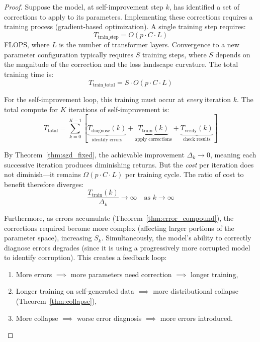 \documentclass[11pt,a4paper]{article}
\begin{document}
\begin{proof}
Suppose the model, at self-improvement step $k$, has identified a set of corrections to apply to its parameters. Implementing these corrections requires a training process (gradient-based optimization). A single training step requires:
\begin{equation}
T_{\mathrm{train\_step}} = O(p \cdot C \cdot L)
\end{equation}
FLOPS, where $L$ is the number of transformer layers. Convergence to a new parameter configuration typically requires $S$ training steps, where $S$ depends on the magnitude of the correction and the loss landscape curvature. The total training time is:
\begin{equation}
T_{\mathrm{train\_total}} = S \cdot O(p \cdot C \cdot L)
\end{equation}

For the self-improvement loop, this training must occur at \emph{every} iteration $k$. The total compute for $K$ iterations of self-improvement is:
\begin{equation}
T_{\mathrm{total}} = \sum_{k=0}^{K-1} \left[\underbrace{T_{\mathrm{diagnose}}(k)}_{\text{identify errors}} + \underbrace{T_{\mathrm{train}}(k)}_{\text{apply corrections}} + \underbrace{T_{\mathrm{verify}}(k)}_{\text{check results}}\right]
\end{equation}

By Theorem~\ref{thm:sgd_fixed}, the achievable improvement $\Delta_k \to 0$, meaning each successive iteration produces diminishing returns. But the \emph{cost} per iteration does not diminish---it remains $\Omega(p \cdot C \cdot L)$ per training cycle. The ratio of cost to benefit therefore diverges:
\begin{equation}
\frac{T_{\mathrm{train}}(k)}{\Delta_k} \to \infty \quad \text{as } k \to \infty
\end{equation}

Furthermore, as errors accumulate (Theorem~\ref{thm:error_compound}), the corrections required become more complex (affecting larger portions of the parameter space), increasing $S_k$. Simultaneously, the model's ability to correctly diagnose errors degrades (since it is using a progressively more corrupted model to identify corruption). This creates a feedback loop:
\begin{enumerate}
    \item More errors $\implies$ more parameters need correction $\implies$ longer training,
    \item Longer training on self-generated data $\implies$ more distributional collapse (Theorem~\ref{thm:collapse}),
    \item More collapse $\implies$ worse error diagnosis $\implies$ more errors introduced.
\end{enumerate}


\end{proof}
\end{document}
